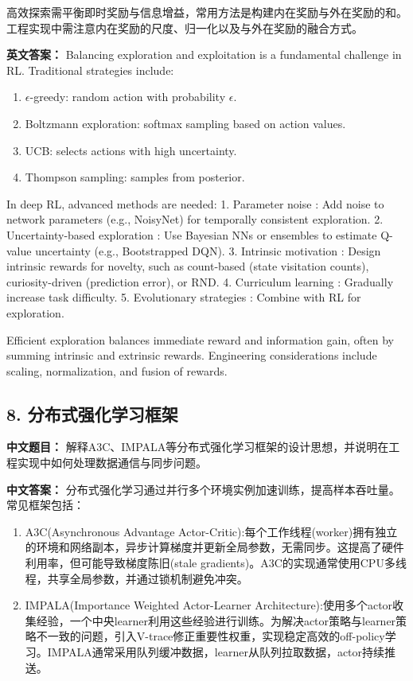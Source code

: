 \documentclass[10pt,a4paper]{ctexart}
\begin{document}
高效探索需平衡即时奖励与信息增益，常用方法是构建内在奖励与外在奖励的和。工程实现中需注意内在奖励的尺度、归一化以及与外在奖励的融合方式。

\textbf{英文答案：}  
Balancing exploration and exploitation is a fundamental challenge in RL. Traditional strategies include:
\begin{enumerate}
    \item \(\epsilon\)-greedy: random action with probability \(\epsilon\).
    \item Boltzmann exploration: softmax sampling based on action values.
    \item UCB: selects actions with high uncertainty.
    \item Thompson sampling: samples from posterior.
\end{enumerate}

In deep RL, advanced methods are needed:
1.  Parameter noise : Add noise to network parameters (e.g., NoisyNet) for temporally consistent exploration.
2.  Uncertainty-based exploration : Use Bayesian NNs or ensembles to estimate Q-value uncertainty (e.g., Bootstrapped DQN).
3.  Intrinsic motivation : Design intrinsic rewards for novelty, such as count-based (state visitation counts), curiosity-driven (prediction error), or RND.
4.  Curriculum learning : Gradually increase task difficulty.
5.  Evolutionary strategies : Combine with RL for exploration.

Efficient exploration balances immediate reward and information gain, often by summing intrinsic and extrinsic rewards. Engineering considerations include scaling, normalization, and fusion of rewards.

\subsection*{8. 分布式强化学习框架}
\textbf{中文题目：} 解释A3C、IMPALA等分布式强化学习框架的设计思想，并说明在工程实现中如何处理数据通信与同步问题。

\textbf{中文答案：}  
分布式强化学习通过并行多个环境实例加速训练，提高样本吞吐量。常见框架包括：

\begin{enumerate}
    \item A3C(Asynchronous Advantage Actor-Critic):每个工作线程(worker)拥有独立的环境和网络副本，异步计算梯度并更新全局参数，无需同步。这提高了硬件利用率，但可能导致梯度陈旧(stale gradients)。A3C的实现通常使用CPU多线程，共享全局参数，并通过锁机制避免冲突。

    \item IMPALA(Importance Weighted Actor-Learner Architecture):使用多个actor收集经验，一个中央learner利用这些经验进行训练。为解决actor策略与learner策略不一致的问题，引入V-trace修正重要性权重，实现稳定高效的off-policy学习。IMPALA通常采用队列缓冲数据，learner从队列拉取数据，actor持续推送。
\end{enumerate}
\end{document}
